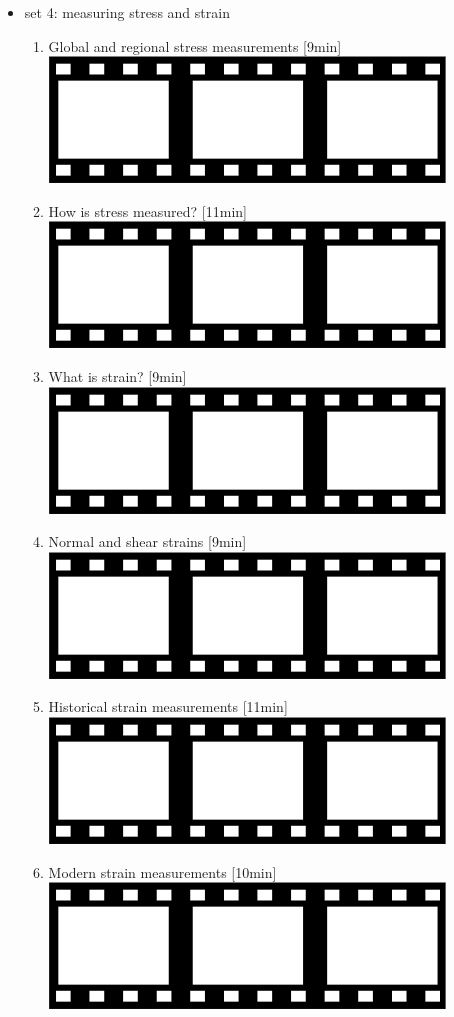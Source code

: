 \begin{itemize}
\item set 4: measuring stress and strain 
\begin{enumerate}
\item Global and regional stress measurements [9min] 
      \href{https://youtu.be/J6yu4fi4kCI?si=KlmhNOcqgycHa1cq}{\includegraphics[width=.8cm]{images/pictograms/film.png}}
\item How is stress measured? [11min] 
      \href{https://youtu.be/FtFGMryqQXI?si=2XIfjtfxgxQtsiIv}{\includegraphics[width=.8cm]{images/pictograms/film.png}}
\item What is strain? [9min] 
      \href{https://youtu.be/DQ345dy84BI?si=C1eJC_mthTaIP7z7}{\includegraphics[width=.8cm]{images/pictograms/film.png}}
\item Normal and shear strains [9min] 
      \href{https://youtu.be/CNXHtMdt-XY?si=i7JiiOyV237gVYLr}{\includegraphics[width=.8cm]{images/pictograms/film.png}}
\item Historical strain measurements [11min] 
      \href{https://youtu.be/TZXt2lk_fr4?si=cEntMD8C6-aB8-dq}{\includegraphics[width=.8cm]{images/pictograms/film.png}}
\item Modern strain measurements [10min] 
      \href{https://youtu.be/ki6X1xjnYCE?si=NJXSi2Wf38uSyMIX}{\includegraphics[width=.8cm]{images/pictograms/film.png}}
\end{enumerate}


\end{itemize}

